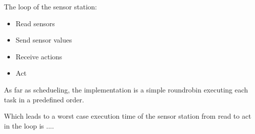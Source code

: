 The loop of the sensor station:
\begin{itemize}
  \item Read sensors
  \item Send sensor values
  \item Receive actions
  \item Act
\end{itemize}

As far as schedueling, the implementation is a simple roundrobin executing each task in a predefined order.

Which leads to a worst case execution time of the sensor station from read to act in the loop is .... 
